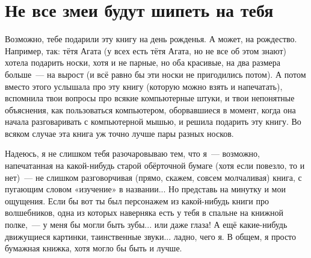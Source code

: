 %
%
%

\chapter{Не все змеи будут шипеть на тебя}\label{ch:notallsnakeswillsquishyou}

Возможно, тебе подарили эту книгу на день рожденья. А может, на рождество. Например, так: тётя Агата (у всех есть тётя Агата, но не все об этом знают) хотела подарить носки, хотя и не парные, но оба красивые, на два размера больше — на вырост (и всё равно бы эти носки не пригодились потом). А потом вместо этого услышала про эту книгу (которую можно взять и напечатать), вспомнила твои вопросы про всякие компьютерные штуки, и твои непонятные объяснения, как пользоваться компьютером, оборвавшиеся в момент, когда она начала разговаривать с компьютерной мышью, и решила подарить эту книгу. Во всяком случае эта книга уж точно лучше пары разных носков.

Надеюсь, я не слишком тебя разочаровываю тем, что я — возможно, напечатанная на какой-нибудь старой обёрточной бумаге (хотя если повезло, то и нет) — не слишком разговорчивая (прямо, скажем, совсем молчаливая) книга, с пугающим словом «изучение» в названии... Но представь на минутку и мои ощущения. Если бы вот ты был персонажем из какой-нибудь книги про волшебников, одна из которых наверняка есть у тебя в спальне на книжной полке, — у меня бы могли быть зубы... или даже глаза! А ещё какие-нибудь движущиеся картинки, таинственные звуки... ладно, чего я. В общем, я просто бумажная книжка, хотя могло бы быть и лучше.

